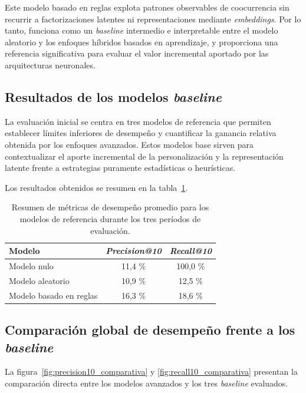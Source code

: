 Este modelo basado en reglas explota patrones observables de coocurrencia sin recurrir a factorizaciones latentes ni representaciones mediante \textit{embeddings}. Por lo tanto, funciona como un \textit{baseline} intermedio e interpretable entre el modelo aleatorio y los enfoques híbridos basados en aprendizaje, y proporciona una referencia significativa para evaluar el valor incremental aportado por las arquitecturas neuronales.

\subsection{Resultados de los modelos \textit{baseline}}

La evaluación inicial se centra en tres modelos de referencia que permiten establecer límites inferiores de desempeño y cuantificar la ganancia relativa obtenida por los enfoques avanzados.
Estos modelos base sirven para contextualizar el aporte incremental de la personalización y la representación latente frente a estrategias puramente estadísticas o heurísticas.

Los resultados obtenidos se resumen en la tabla~\ref{tab:resultados_baseline}.  

\begin{table}[H]
	\centering
	\caption[Resultados comparativos de los modelos \textit{baseline}]{Resumen de métricas de desempeño promedio para los modelos de referencia durante los tres períodos de evaluación.}
	\begin{tabular}{l c c}    
		\toprule
		\textbf{Modelo} & \textbf{\textit{Precision@10}} & \textbf{\textit{Recall@10}} \\
		\midrule
		Modelo nulo & 11{,}4 \% & 100{,}0 \% \\
		Modelo aleatorio & 10{,}9 \% & 12{,}5 \% \\
		Modelo basado en reglas & 16{,}3 \% & 18{,}6 \% \\
		\bottomrule
	\end{tabular}
	\label{tab:resultados_baseline}
\end{table}

\subsection{Comparación global de desempeño frente a los \textit{baseline}}

La figura~\ref{fig:precision10_comparativa} y \ref{fig:recall10_comparativa} presentan la comparación directa entre los modelos avanzados y los tres \textit{baseline} evaluados. 

